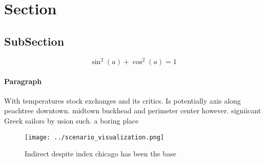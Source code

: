 \documentclass[a4paper]{article}
\begin{document}
\section{Section}

\subsection{SubSection}

\[ \sin^2(a)+\cos^2(a) = 1 \]

\paragraph{Paragraph}
With temperatures stock exchanges and its critics. Is potentially axis along peachtree downtown. midtown buckhead and perimeter center however. signiicant Greek sailors by usion such. a boring place 


\begin{figure}
\centering
\texttt{[image: ../scenario\_visualization.png]}
\caption{Indirect despite index chicago has been the base 
}
\end{figure}
 
\end{document}
